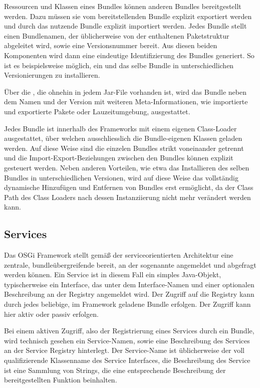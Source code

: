 Ressourcen und Klassen
eines Bundles können anderen Bundles bereitgestellt werden. Dazu müssen sie vom
bereitstellenden Bundle explizit exportiert werden und durch das nutzende
Bundle explizit importiert werden. Jedes Bundle stellt einen
Bundlenamen, der üblicherweise von der enthaltenen Paketstruktur
abgeleitet wird, sowie eine Versionsnummer bereit. Aus diesen beiden Komponenten
wird dann eine eindeutige Identifizierung des Bundles generiert.
So ist es beispielsweise möglich, ein und das selbe Bundle in unterschiedlichen
Versionierungen zu installieren.

Über die , die ohnehin in jedem Jar-File vorhanden ist, wird
das Bundle neben dem Namen und der Version mit weiteren Meta-Informationen, wie
importierte und exportierte Pakete oder Lauzeitumgebung, ausgestattet.

Jedes Bundle ist innerhalb des Frameworks mit einem eigenen Class-Loader
ausgestattet, über welchen ausschliesslich die Bundle-eigenen Klassen geladen
werden. Auf diese Weise sind die einzelen Bundles strikt voneinander getrennt und die
Import-Export-Beziehungen zwischen den Bundles können explizit gesteuert
werden. 
Neben anderen Vorteilen, wie etwa das Installieren des selben Bundles in
unterschiedlichen Versionen, wird auf diese Weise das vollständig
dynamische Hinzufügen und Entfernen von Bundles erst ermöglicht, da der
Class Path des Class Loaders nach dessen Instanziierung nicht mehr verändert
werden kann.
\citep{wtherich_die_2008}

\subsection{Services} %
Das OSGi Framework stellt gemäß der serviceorientierten Architektur eine
zentrale, bundleübergreifende  bereit, an der
sogenannte  angemeldet und abgefragt werden können.
Ein Service ist in diesem Fall ein simples Java-Objekt, typischerweise ein
Interface, das unter dem Interface-Namen und einer optionalen Beschreibung an
der Registry angemeldet wird.
Der Zugriff auf die Registry kann durch jedes beliebige, im
Framework geladene Bundle erfolgen. Der Zugriff kann hier aktiv oder passiv
erfolgen.

Bei einem aktiven Zugriff, also der Registrierung eines Services durch ein
Bundle, wird technisch gesehen ein Service-Namen, sowie eine Beschreibung des
Services an der Service Registry hinterlegt. Der Service-Name ist üblicherweise
der voll qualifizierende Klassenname des Service Interfaces, die Beschreibung
des Service ist eine Sammlung von Strings, die eine entsprechende Beschreibung
der bereitgestellten Funktion beinhalten.

